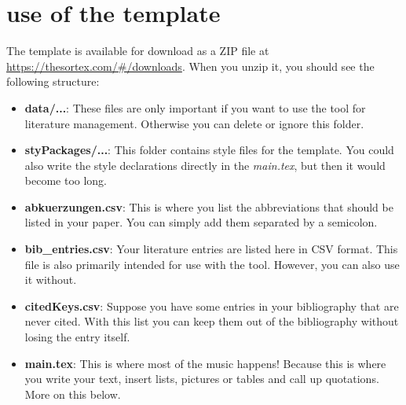 \documentclass[12pt]{article}
\begin{document}
\part{use of the template}
The template is available for download as a ZIP file at \url{https://thesortex.com/#/downloads}. When you unzip it, you should see the following structure:
\begin{itemize}
\setlength\itemsep{.15em}
\item \textbf{data/...}: These files are only important if you want to use the tool for literature management. Otherwise you can delete or ignore this folder.
\item \textbf{styPackages/...}: This folder contains style files for the template. You could also write the style declarations directly in the \textit{main.tex}, but then it would become too long.
\item \textbf{abkuerzungen.csv}: This is where you list the abbreviations that should be listed in your paper. You can simply add them separated by a semicolon.
\item \textbf{bib{\_}entries.csv}: Your literature entries are listed here in CSV format. This file is also primarily intended for use with the tool. However, you can also use it without.
\item \textbf{citedKeys.csv}: Suppose you have some entries in your bibliography that are never cited. With this list you can keep them out of the bibliography without losing the entry itself.
\item \textbf{main.tex}: This is where most of the music happens! Because this is where you write your text, insert lists, pictures or tables and call up quotations. More on this below.
\end{itemize}
\end{document}

